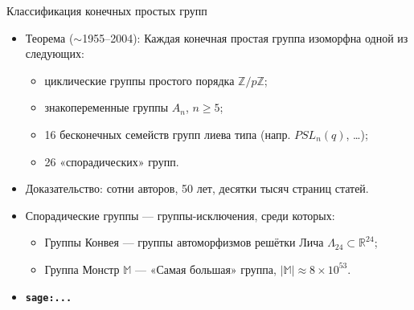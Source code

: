 \documentclass[serif, aspectratio=169]{beamer}
\newcommand{\sagemark}{%
  \textcolor{green!40!black}{\textbf{\texttt{sage:...}}}%
}
\begin{document}
\begin{frame}{Классификация конечных простых групп}
    \begin{itemize}
        \item Теорема ($\sim$1955--2004): Каждая конечная простая группа изоморфна одной из следующих:
        \begin{itemize}
            \item циклические группы простого порядка $\mathbb Z/p\mathbb Z$;
            \item знакопеременные группы $A_n$, $n\geqslant 5$;
            \item 16 бесконечных семейств групп лиева типа (напр. $PSL_n(q)$, \dots);
            \item 26 «спорадических» групп.
        \end{itemize}
        \item Доказательство: сотни авторов, 50 лет, десятки тысяч страниц статей.
        \item Спорадические группы --- группы-исключения, среди которых:
        \begin{itemize}
            \item Группы Конвея --- группы автоморфизмов решётки Лича $\Lambda_{24}\subset\mathbb R^{24}$;
            \item Группа Монстр $\mathbb M$ --- «Самая большая» группа, $|\mathbb M|\approx8\times10^{53}$.
        \end{itemize}
        \item \sagemark
    \end{itemize}
    \note{
        \begin{itemize}
            \item ---
        \end{itemize}
    }
\end{frame}
\end{document}

